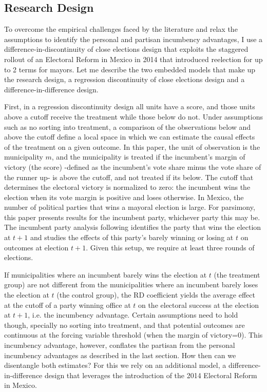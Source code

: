 \subsection{Research Design}

To overcome the empirical challenges faced by the literature and relax the assumptions to identify the personal and partisan incumbency advantages, I use a difference-in-discontinuity of close elections design that exploits the staggered rollout of an Electoral Reform in Mexico in 2014 that introduced reelection for up to 2 terms for mayors. Let me describe the two embedded models that make up the research design, a regression discontinuity of close elections design and a difference-in-difference design. 

First, in a regression discontinuity design all units have a score, and those units above a cutoff receive the treatment while those below do not. Under assumptions such as no sorting into treatment, a comparison of the observations below and above the cutoff define a local space in which we can estimate the causal effects of the treatment on a given outcome. In this paper, the unit of observation is the municipality $m$, and the municipality is treated if the incumbent's margin of victory (the score) -defined as the incumbent's vote share minus the vote share of the runner up- is above the cutoff, and not treated if its below. The cutoff that determines the electoral victory is normalized to zero: the incumbent wins the election when its vote margin is positive and loses otherwise. In Mexico, the number of political parties that wins a mayoral election is large. For parsimony, this paper presents results for the incumbent party, whichever party this may be. The incumbent party analysis following \citet{klasnja_titiunik_2017} identifies the party that wins the election at $t+1$ and studies the effects of this party's barely winning or losing at $t$ on outcomes at election $t+1$. Given this setup, we require at least three rounds of elections. 

If municipalities where an incumbent barely wins the election at $t$ (the treatment group) are not different from the municipalities where an incumbent barely loses the election at $t$ (the control group), the RD coefficient yields the average effect at the cutoff of a party winning office at $t$ on the electoral success at the election at $t+1$, i.e. the incumbency advantage. Certain assumptions need to hold though, specially no sorting into treatment, and that potential outcomes are continuous at the forcing variable threshold (when the margin of victory=0). This incumbency advantage, however, conflates the partisan from the personal incumbency advantages as described in the last section. How then can we disentangle both estimates? For this we rely on an additional model, a difference-in-difference design that leverages the introduction of the 2014 Electoral Reform in Mexico.


